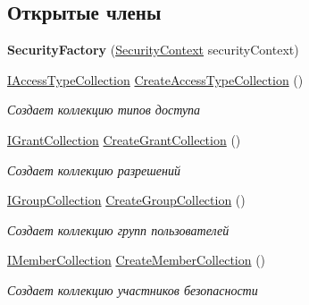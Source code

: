 \subsection*{Открытые члены}
\begin{DoxyCompactItemize}
\item 
\mbox{\label{class_security_1_1_entity_framework_1_1_security_factory_a04bcbc3b30b0bf2a01638c6342eda835}} 
{\bfseries Security\+Factory} (\hyperlink{class_security_1_1_entity_dal_1_1_security_context}{Security\+Context} security\+Context)
\item 
\hyperlink{interface_security_1_1_interfaces_1_1_collections_1_1_i_access_type_collection}{I\+Access\+Type\+Collection} \hyperlink{class_security_1_1_entity_framework_1_1_security_factory_aa952c6d768a5219de923e06f2c7a6def}{Create\+Access\+Type\+Collection} ()
\begin{DoxyCompactList}\small\item\em Создает коллекцию типов доступа \end{DoxyCompactList}\item 
\hyperlink{interface_security_1_1_interfaces_1_1_collections_1_1_i_grant_collection}{I\+Grant\+Collection} \hyperlink{class_security_1_1_entity_framework_1_1_security_factory_a63112a33e799949f653a7b3420bb5a83}{Create\+Grant\+Collection} ()
\begin{DoxyCompactList}\small\item\em Создает коллекцию разрешений \end{DoxyCompactList}\item 
\hyperlink{interface_security_1_1_interfaces_1_1_collections_1_1_i_group_collection}{I\+Group\+Collection} \hyperlink{class_security_1_1_entity_framework_1_1_security_factory_ad08ab6dc0f55eba7bc8adfc3a982ae1b}{Create\+Group\+Collection} ()
\begin{DoxyCompactList}\small\item\em Создает коллекцию групп пользователей \end{DoxyCompactList}\item 
\hyperlink{interface_security_1_1_interfaces_1_1_collections_1_1_i_member_collection}{I\+Member\+Collection} \hyperlink{class_security_1_1_entity_framework_1_1_security_factory_a46e859ae40869883722f3475a35f6eeb}{Create\+Member\+Collection} ()
\begin{DoxyCompactList}\small\item\em Создает коллекцию участников безопасности \end{DoxyCompactList}\item 

\end{DoxyCompactItemize}
